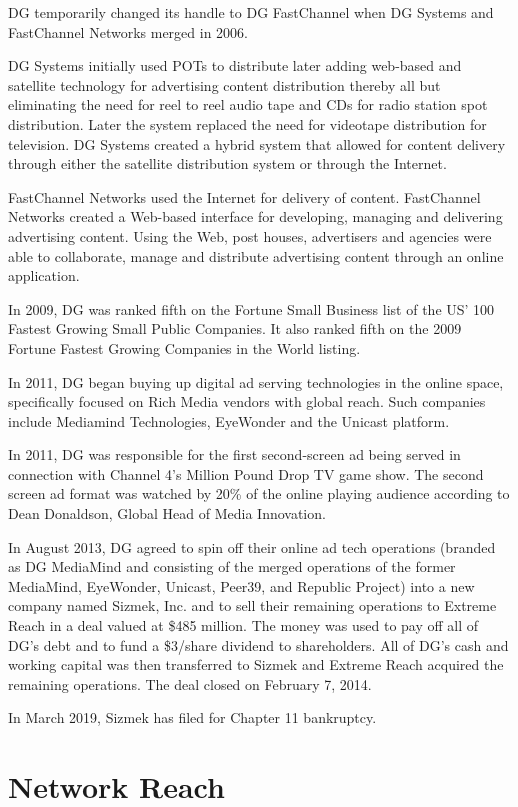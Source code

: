 DG temporarily changed its handle to DG FastChannel when DG Systems and
FastChannel Networks merged in 2006.

DG Systems initially used POTs to distribute later adding web-based and
satellite technology for advertising content distribution thereby all
but eliminating the need for reel to reel audio tape and CDs for radio
station spot distribution. Later the system replaced the need for
videotape distribution for television. DG Systems created a hybrid
system that allowed for content delivery through either the satellite
distribution system or through the Internet.

FastChannel Networks used the Internet for delivery of content.
FastChannel Networks created a Web-based interface for developing,
managing and delivering advertising content. Using the Web, post houses,
advertisers and agencies were able to collaborate, manage and distribute
advertising content through an online application.

In 2009, DG was ranked fifth on the Fortune Small Business list of the
US' 100 Fastest Growing Small Public Companies. It also ranked fifth on
the 2009 Fortune Fastest Growing Companies in the World listing.

In 2011, DG began buying up digital ad serving technologies in the
online space, specifically focused on Rich Media vendors with global
reach. Such companies include Mediamind Technologies, EyeWonder and the
Unicast platform.

In 2011, DG was responsible for the first second-screen ad being served
in connection with Channel 4's Million Pound Drop TV game show. The
second screen ad format was watched by 20\% of the online playing
audience according to Dean Donaldson, Global Head of Media Innovation.

In August 2013, DG agreed to spin off their online ad tech operations
(branded as DG MediaMind and consisting of the merged operations of the
former MediaMind, EyeWonder, Unicast, Peer39, and Republic Project) into
a new company named Sizmek, Inc. and to sell their remaining operations
to Extreme Reach in a deal valued at \$485 million. The money was used
to pay off all of DG's debt and to fund a \$3/share dividend to
shareholders. All of DG's cash and working capital was then transferred
to Sizmek and Extreme Reach acquired the remaining operations. The deal
closed on February 7, 2014.

In March 2019, Sizmek has filed for Chapter 11 bankruptcy.

\section{Network Reach}\label{network-reach}

